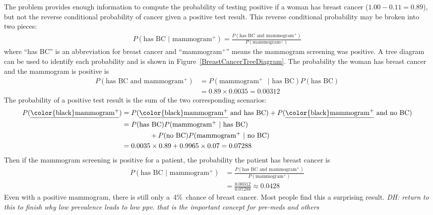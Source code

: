 \begin{doublespace}
\begin{example}
The problem provides enough information to compute the probability of testing positive if a woman has breast cancer ($1.00-0.11=0.89$), but not the reverse conditional probability of cancer given a positive test result.  This reverse conditional probability may be broken into two pieces:
\begin{align*}
P(\text{has BC } | \text{ mammogram$^+$}) = \frac{P(\text{has BC and mammogram$^+$})}{P(\text{mammogram$^+$})}
\end{align*}
where ``has BC'' is an abbreviation for breast cancer and ``mammogram$^+$'' means the mammogram screening was positive. A tree diagram can be used to identify each probability and is shown in Figure~\ref{BreastCancerTreeDiagram}. The probability the woman has breast cancer and the mammogram is positive is
\begin{align*}
P(\text{has BC and mammogram$^+$}) &= P(\text{mammogram$^+$ } | \text{ has BC})P(\text{has BC}) \\
	&= 0.89\times 0.0035 = 0.00312
\end{align*}
The probability of a positive test result is the sum of the two corresponding scenarios:
\begin{align*}
P(\text{\underline{\color{black}mammogram$^+$}}) &= P(\text{\underline{\color{black}mammogram$^+$} and has BC}) + P(\text{\underline{\color{black}mammogram$^+$} and no BC}) \\
	&= P(\text{has BC})P(\text{mammogram$^+$ } | \text{ has BC}) \\
	&\qquad\qquad	+ P(\text{no BC})P(\text{mammogram$^+$ } | \text{ no BC}) \\
	&= 0.0035\times 0.89 + 0.9965\times 0.07 = 0.07288
\end{align*}
Then if the mammogram screening is positive for a patient, the probability the patient has breast cancer is
\begin{align*}
P(\text{has BC } | \text{ mammogram$^+$})
	&= \frac{P(\text{has BC and mammogram$^+$})}{P(\text{mammogram$^+$})}\\
	&= \frac{0.00312}{0.07288} \approx 0.0428
\end{align*}
Even with a positive mammogram, there is still only a~4\%~chance of breast cancer.  Most people find this a surprising result.  \textit{DH: return to this to finish why low prevalence leads to low ppv. that is the important concept for pre-meds and others}
\end{example}



\end{doublespace}
